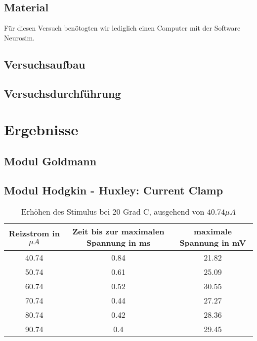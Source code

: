 \documentclass[11pt]{article}
\begin{document}
\subsection{Material}
Für diesen Versuch benötogten wir lediglich einen Computer mit der Software Neurosim. 

\subsection{Versuchsaufbau}

\subsection{Versuchsdurchführung}

\section{Ergebnisse}
\subsection{Modul Goldmann}

\subsection{Modul Hodgkin - Huxley: Current Clamp}

\begin{table}[H]
\caption{Erhöhen des Stimulus bei 20 Grad C, ausgehend von $40.74\mu A$}
\begin{center}
\begin{tabular}{c|c|c}
Reizstrom in $\mu A$ & Zeit bis zur maximalen Spannung in ms & maximale Spannung in mV \\
\hline\hline
40.74 & 0.84 & 21.82\\
50.74 & 0.61 & 25.09\\
60.74 & 0.52 & 30.55\\
70.74 & 0.44 & 27.27\\
80.74 & 0.42 & 28.36\\
90.74 & 0.4 & 29.45\\
\end{tabular}
\end{center}
\label{werte}
\end{table}
\end{document}
